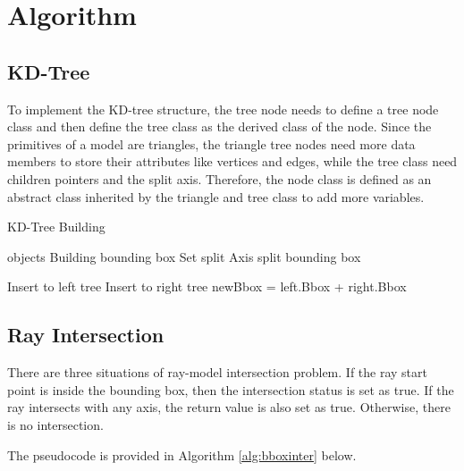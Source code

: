 \section{Algorithm}

\subsection{KD-Tree}

To implement the KD-tree structure, the tree node needs to define a tree node class and then define the tree class as the derived class of the node. Since the primitives of a model are triangles, the triangle tree nodes need more data members to store their attributes like vertices and edges, while the tree class need children pointers and the split axis. Therefore, the node class is defined as an abstract class inherited by the triangle and tree class to add more variables.

\begin{breakablealgorithm}
    \caption{KD-Tree Building}
    \label{ds:kdbuild}
    \begin{algorithmic}

        \Require objects
        \State Building bounding box
        \State Set split Axis
        \Statex
        \State split bounding box
        \\
        
        \State Insert to left tree
        \Else
        \State Insert to right tree
        \EndIf
        \EndFor
        \State newBbox = left.Bbox + right.Bbox
    \end{algorithmic}
\end{breakablealgorithm}

\subsection{Ray Intersection}

There are three situations of ray-model intersection problem. If the ray start point is inside the bounding box, then the intersection status is set as true. If the ray intersects with any axis, the return value is also set as true. Otherwise, there is no intersection.

\hspace*{\fill}

The pseudocode is provided in Algorithm \ref{alg:bboxinter} below.

